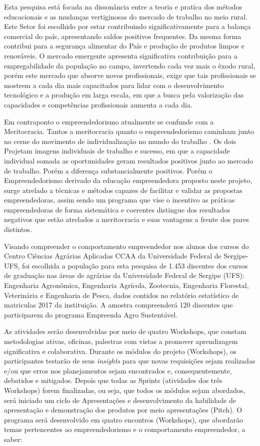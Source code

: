Esta pesquisa está focada na dissonância entre a teoria e pratica dos métodos educacionais e as mudanças vertiginosas do mercado de trabalho no meio rural. Este Setor foi escolhido por estar contribuindo significativamente para a balança comercial do país, apresentando saldos positivos frequentes. Da mesma forma contribui para a segurança alimentar do País e produção de produtos limpos e renováveis. O mercado emergente apresenta significativa contribuição para a empregabilidade da população no campo, invertendo cada vez mais o êxodo rural, porém este mercado que absorve novos profissionais, exige que tais profissionais se mostrem a cada dia mais capacitados para lidar com o desenvolvimento tecnológico e a produção em larga escala, em que a busca pela valorização das capacidades e competências profissionais aumenta a cada dia. 

Em contraponto o empreendedorismo atualmente se confunde com a Meritocracia. Tantos a meritocracia quanto o empreendedorismo caminham junto no cerne do movimento de individualização no mundo do trabalho \cite{noauthor_empreendedorismo_nodate}. Os dois  Projetam imagens individuais de trabalho e sucesso, em que a capacidade individual somada as oportunidades geram resultados positivos junto ao mercado de trabalho. Porém a diferença substancialmente positivos. Porém o Empreendedorismo derivado da educação empreendedora proposto neste projeto, surge atrelado a técnicas e métodos capazes de facilitar e validar as propostas empreendedoras, assim sendo um programa que vise o incentivo as práticas empreendedoras de forma sistemática e coerentes distingue dos resultados negativos que estão atrelados a meritocracia e suas vantagens a frente dos pares distintos.

Visando compreender o comportamento empreendedor nos alunos dos cursos do Centro Ciências Agrárias Aplicadas CCAA da Universidade Federal de Sergipe-UFS, foi escolhida a população para esta pesquisa de 1.453 discentes dos cursos de graduação nas áreas de agrárias da Universidade Federal de Sergipe (UFS): Engenharia Agronômica, Engenharia Agrícola, Zootecnia, Engenharia Florestal, Veterinária e Engenharia de Pesca, dados contidos no relatório estatístico de matriculas 2017 da instituição. A amostra compreenderá  120 discentes que participarem do programa Empreenda Agro Sustentável.

As atividades serão desenvolvidas por meio de quatro Workshops, que constam metodologias ativas, oficinas, palestras com vistas a promover aprendizagem significativa e colaborativa. Durante os módulos do projeto (Workshops), os participantes testarão de seus \textit{insights} para que novas requisições sejam realizadas e/ou que erros nos planejamentos sejam encontrados e, consequentemente, debatidos e mitigados. Depois que todas as Sprints (atividades dos três Workshops) forem finalizadas, ou seja, que todos os módulos sejam abordados, será iniciado um ciclo de Apresentações e desenvolvimento da habilidade de apresentação e demonstração dos produtos por meio apresentações (Pitch). O programa será desenvolvido em quatro encontros (Workshops), que abordarão temas pertencentes ao empreendedorismo e o comportamento empreendedor, a saber: 

